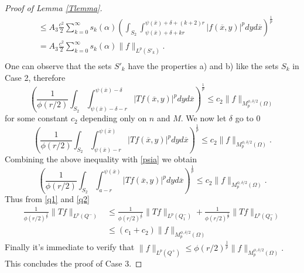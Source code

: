 \documentclass[12pt]{article}
\theoremstyle{definition}
\begin{document}
\begin{proof}[Proof of Lemma \ref{Tlemma}]
\begin{align*}
&\le A_3 \frac{c^2}{2} \sum_{k=0}^\infty s_k(\alpha) \left (\int_{S_2} \int_{\psi(\overline x) +\delta +kr}^{\psi(\overline x) +\delta +(k+2)r}|f(\overline x, y)|^p  dy d\overline x\right) ^{\frac{1}{p}}\\
&=A_3 \frac{c^2}{2} \sum_{k=0}^\infty s_k(\alpha) \|f\|_{L^p(S'_k)}. \\
\end{align*}
One can observe that the sets $S'_k$ have the properties a) and b) like the sets $S_k$ in Case 2, therefore
\[  \left(\frac{1}{\phi(r/2)}\int_{S_2} \int_{\psi(\overline x)-\delta-r}^{\psi(\overline x)-\delta}|Tf(\overline x,y)|^p dy d\overline x\right)^{\frac{1}{p}}\le c_2 \| f\|_{M_p^{\phi,\delta/2}(\Omega)} \]
for some constant $c_2$ depending only on $n$ and $M$. We now let $\delta$ go to 0 
\begin{equation}
  \left(\frac{1}{\phi(r/2)}\int_{S_2} \int_{\psi(\overline x)-r}^{\psi(\overline x)}|Tf(\overline x,y)|^p dy d\overline x\right)^{\frac{1}{p}}\le c_2 \| f\|_{M_p^{\phi,\delta/2}(\Omega)} . \label{q2}
 \end{equation}
Combining the above inequality with \eqref{psia} we obtain
\[  \left(\frac{1}{\phi(r/2)}\int_{S_2} \int_{a-r}^{\psi(\overline x)}|Tf(\overline x,y)|^p dy d\overline x\right)^{\frac{1}{p}}\le c_2 \| f\|_{M_p^{\phi,\delta/2}(\Omega)} .\]
Thus from \eqref{q1} and \eqref{q2}
\begin{align*}
\frac{1}{\phi(r/2)^{\frac{1}{p}}} \| Tf\|_{L^p(Q^-)} &\le \frac{1}{\phi(r/2)^{\frac{1}{p}}} \| Tf\|_{L^p(Q^-_1)} +\frac{1}{\phi(r/2)^{\frac{1}{p}}} \| Tf\|_{L^p(Q^-_2)} \\
&\le (c_1 +c_2)\| f\|_{M_p^{\phi,\delta/2}(\Omega)} 
\end{align*}
 Finally it's immediate to verify that $\| f\|_{L^p(Q^+)} \le \phi(r/2)^{\frac{1}{p}} \| f\|_{M_p^{\phi,\delta/2}(\Omega)}.$ This concludes the proof of Case 3.


\end{proof}
\end{document}
